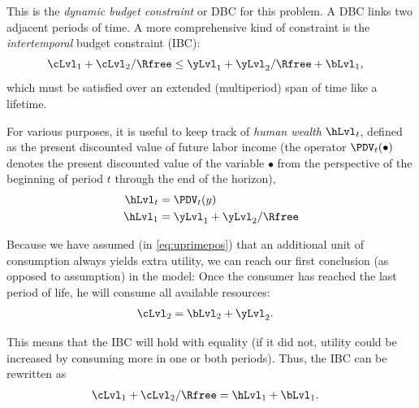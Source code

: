 \documentclass{scrartcl}
\begin{document}
  This is the \textit{dynamic budget constraint} or DBC for this problem.
  A DBC links two adjacent periods of time.
  A more comprehensive kind of constraint is the \textit{intertemporal} budget constraint (IBC):
  \begin{equation}\begin{gathered}\begin{aligned} \cLvl_{1}+\cLvl_{2}/\Rfree & \leq \yLvl_{1}+\yLvl_{2}/\Rfree+\bLvl_{1} \label{eq:ibcineq},
      \end{aligned}\end{gathered}\end{equation} which must be satisfied over an extended (multiperiod) span of time like a lifetime.

  For various purposes, it is useful to keep track of \textit{human wealth} $\hLvl_{t}$, defined as the present discounted value of future labor income (the operator $\PDV_{t}(\bullet)$ denotes the present discounted value of the variable $\bullet$ from the perspective of the beginning of period $t$ through the end of the horizon),
  \begin{equation}\begin{gathered}\begin{aligned} \hLvl_{t} & = \PDV_{t}(y) \label{eq:humw} \\ \hLvl_{1} & = \yLvl_{1}+\yLvl_{2}/\Rfree
      \end{aligned}\end{gathered}\end{equation}

  Because we have assumed (in \eqref{eq:uprimepos}) that an additional unit of consumption always yields extra utility, we can reach our first conclusion (as opposed to assumption) in the model: Once the consumer has reached the last period of life, he will consume all available resources:
  \begin{equation}\begin{gathered}\begin{aligned} \cLvl_{2} & = \bLvl_{2}+\yLvl_{2}.
      \end{aligned}\end{gathered}\end{equation}

  This means that the IBC will hold with equality (if it did not, utility could be increased by consuming more in one or both periods).
  Thus, the IBC can be rewritten as
  \begin{equation}\begin{gathered}\begin{aligned} \cLvl_{1}+\cLvl_{2}/\Rfree & = \hLvl_{1}+\bLvl_{1} \label{eq:ibc}.
      \end{aligned}\end{gathered}\end{equation}
\end{document}
